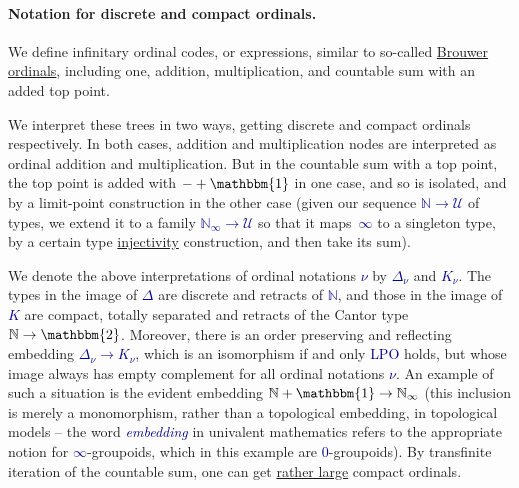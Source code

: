 \documentclass[a4paper]{easychair}
\newcommand{\db}{\textcolor{darkblue}}
\newcommand{\Kappa}{K}
\newcommand{\df}[1]{\emph{\db{#1}}}
\newcommand{\m}[1]{\db{$#1$}}
\newcommand{\N}{\mathbb{N}}
\newcommand{\NI}{\N_\infty}
\newcommand{\U}{\mathcal{U}}
\newcommand{\One}{\mathbbm{1}}
\newcommand{\Two}{\mathbbm{2}}
\begin{document}
\paragraph{Notation for discrete and compact ordinals.}
We define infinitary ordinal codes, or expressions, similar to so-called \href{http://www.cse.chalmers.se/~coquand/ordinal.ps}{Brouwer
ordinals}, including one, addition, multiplication, and countable sum
with an added top point.

We interpret these trees in two ways, getting discrete and compact
ordinals respectively. In both cases, addition and multiplication
nodes are interpreted as ordinal addition and multiplication. But in
the countable sum with a top point, the top point is added with
\m{-+\One} in one case, and so is isolated, and by a limit-point
construction in the other case (given our sequence \m{\N \to \U} of
types, we extend it to a family \m{\NI \to \U} so that it
maps~\m{\infty} to a singleton type, by a certain type
\href{https://en.wikipedia.org/wiki/Injective_object}{injectivity}
construction, and then take its sum).

We denote the above interpretations of ordinal notations \m{\nu} by
\m{\Delta_\nu} and \m{\Kappa_\nu}. The types in the image of
\m{\Delta} are discrete and retracts of \m{\N}, and those in the image
of \m{\Kappa} are compact, totally separated and retracts of the
Cantor type \m{\N \to \Two}.  Moreover, there is an order preserving
and reflecting embedding \m{\Delta_\nu \to \Kappa_\nu}, which is an
isomorphism if and only \db{LPO} holds, but whose image always has
empty complement for all ordinal notations \m{\nu}. An example of such
a situation is the evident embedding \m{\N + \One \to \NI} (this
inclusion is merely a monomorphism, rather than a topological
embedding, in topological models -- the word \df{embedding} in
univalent mathematics refers to the appropriate notion for
\m{\infty}-groupoids, which in this example are \m{0}-groupoids).  By
transfinite iteration of the countable sum, one can get
\href{http://www.cs.swan.ac.uk/~csetzer/articles/weor0.pdf}{rather
  large} compact ordinals.
\end{document}
